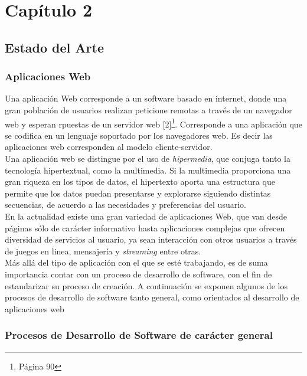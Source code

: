 \chapter{Capítulo 2}
\section{Estado del Arte}

\subsection{Aplicaciones Web}

Una aplicación Web corresponde a un software basado en internet, donde una gran población de 
usuarios realizan peticione remotas a través de un navegador web y esperan rpuestas de un 
servidor web [2]\footnote{Página 90}. Corresponde a una aplicación que se codifica en un lenguaje 
soportado por los navegadores web. Es decir las aplicaciones web corresponden al modelo 
cliente-servidor.\\

Una aplicación web se distingue por el uso de \textit{hipermedia}, que conjuga tanto la tecnología 
hipertextual, como la multimedia. Si la multimedia proporciona una gran riqueza en los tipos de datos, 
el hipertexto aporta una estructura que permite que los datos puedan presentarse y explorarse siguiendo 
distintas secuencias, de acuerdo a las necesidades y preferencias del usuario.\\

En la actualidad existe una gran variedad de aplicaciones Web, que van desde páginas sólo de carácter 
informativo hasta aplicaciones complejas que ofrecen diversidad de servicios al usuario, ya sean interacción
con otros usuarios a través de juegos en linea, mensajería y \textit{streaming} entre otras.\\

Más allá del tipo de aplicación con el que se esté trabajando, es de suma importancia contar con un 
proceso de desarrollo de software, con el fin de estandarizar su proceso de creación. A continuación 
se exponen algunos de los procesos de desarrollo de software tanto general, como orientados al desarrollo 
de aplicaciones web\\


\subsection{Procesos de Desarrollo de Software de carácter general}

